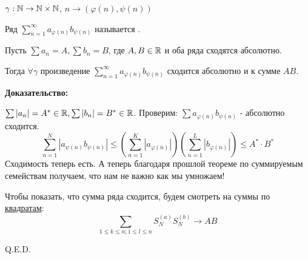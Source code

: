 $\gamma: \mathbb{N} \rightarrow \mathbb{N} \times \mathbb{N}$, $n \rightarrow (\varphi(n), \psi(n))$

Ряд $\sum\limits_{n=1}^\infty a_{\varphi(n)}b_{\psi(n)}$ называется .


Пусть $\sum a_n = A, \sum b_n = B$, где $A,B \in \mathbb{R}$ и оба ряда сходятся абсолютно.

Тогда $\forall \gamma $ произведение  $\sum\limits_{n=1}^\infty a_{\varphi(n)}b_{\psi(n)}$ сходится абсолютно и к сумме $AB$.

\textbf{Доказательство:}

$\sum |a_n| = A^* \in \mathbb{R}, \sum|b_n|=B^*\in \mathbb{R}$. Проверим: $\sum a_{\varphi(n)}b_{\psi(n)}$ - абсолютно сходится.
$$\sum_{n=1}^N |a_{\psi(n)}b_{\psi(n)}|\leq \left(\sum\limits_{n=1}^K |a_{\varphi(n)}|\right)\left( \sum\limits_{n=1}^L |b_{\varphi(n)}|\right)\leq A^*\cdot B^*$$
Сходимость теперь есть. А теперь благодаря прошлой теореме по суммируемым семействам получаем, что нам не важно как мы умножаем!

Чтобы показать, что сумма ряда сходится, будем смотреть на суммы по \uline{квадратам}: 
$$\sum\limits_{1\leq k\leq n ; 1 \leq l \leq n} S_N^{(a)}S_N^{(b)} \rightarrow AB$$

\hfill Q.E.D.




